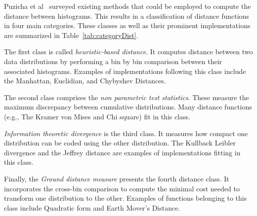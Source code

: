 Puzicha et al~\cite{Puzicha:99} surveyed existing methods that could be employed to compute the distance between histograms. This results in a classification of distance functions in four main categories.
These classes as well as their prominent implementations are summarized in Table~\ref{tab:categoryDist}. 
  \begin{table}[b]
 \centering \scriptsize
{}
 \caption{Classification of some existing dissimilarity/distance functions}
 \label{tab:categoryDist}
\end{table}

The first class is called \emph{heuristic-based distance}. It computes distance between two data distributions by performing a bin by bin comparison between their associated histograms. Examples of implementations following this class include the Manhattan, Euclidian, and Chybyshev Distances.

The second class comprises the \emph{non parametric test statistics}. These measure the maximum discrepancy between cumulative distributions. Many distance functions (e.g., The Kramer von Mises and Chi square) fit in this class. 

\emph{Information theoretic divergence} is the third class. It measures how compact one distribution can be coded using the other distribution. The Kullback Leibler divergence and the Jeffrey distance are examples of implementations fitting in this class.

Finally, the \emph{Ground distance measure} presents the fourth distance class. It incorporates the cross-bin comparison to compute the minimal cost needed to transform one distribution to the other. Examples of functions belonging to this class include Quadratic form and Earth Mover's Distance.





